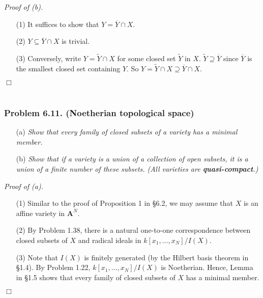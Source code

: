 \documentclass{article}
\begin{document}
\emph{Proof of (b).}
\begin{enumerate}
\item[(1)]
  It suffices to show that $Y = \overline{Y} \cap X$.

\item[(2)]
  $Y \subseteq \overline{Y} \cap X$ is trivial.

\item[(3)]
  Conversely, write $Y = \widetilde{Y} \cap X$
  for some closed set $\widetilde{Y}$ in $X$.
  $\widetilde{Y} \supseteq \overline{Y}$ since $\overline{Y}$ is the smallest closed set
  containing $Y$.
  So
  $Y = \widetilde{Y} \cap X \supseteq \overline{Y} \cap X$.
\end{enumerate}
$\Box$ \\\\







\subsubsection*{Problem 6.11. (Noetherian topological space)}
\begin{enumerate}
\item[(a)]
  \emph{Show that every family of closed subsets of a variety has a minimal member.}

\item[(b)]
  \emph{Show that if a variety is a union of a collection of open subsets,
  it is a union of a finite number of these subsets.
  (All varieties are \textbf{quasi-compact}.)} \\
\end{enumerate}



\emph{Proof of (a).}
\begin{enumerate}
\item[(1)]
  Similar to the proof of Proposition 1 in \S 6.2,
  we may assume that $X$ is an affine variety in $\mathbf{A}^{N}$.

\item[(2)]
  By Problem 1.38, there is a natural one-to-one correspondence
  between closed subsets of $X$ and radical ideals in $k[x_1,\ldots,x_N]/I(X)$.

\item[(3)]
  Note that $I(X)$ is finitely generated (by the Hilbert basis theorem in \S 1.4).
  By Problem 1.22, $k[x_1,\ldots,x_N]/I(X)$ is Noetherian.
  Hence, Lemma in \S 1.5 shows that
  every family of closed subsets of $X$ has a minimal member.
\end{enumerate}
$\Box$ \\
\end{document}
